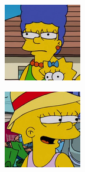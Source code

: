 \documentclass[11pt,francais]{article}
\begin{document}
\begin{figure}[!h]
\begin{subfigure}[b]{0.19\textwidth}
    \end{subfigure}
    \begin{subfigure}[b]{0.19\textwidth}
        \includegraphics[width=\textwidth]{Figures/Simpsons_Dataset/25.png}
    \end{subfigure}
    \begin{subfigure}[b]{0.19\textwidth}
        \includegraphics[width=\textwidth]{Figures/Simpsons_Dataset/8.png}

\end{subfigure}
\end{figure}
\end{document}
